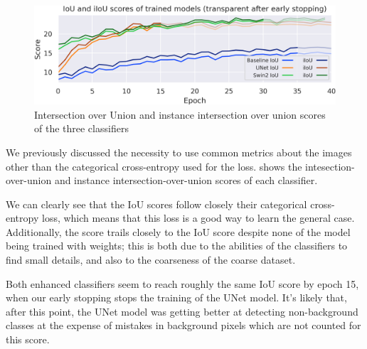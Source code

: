 \begin{figure}[h]
	\centering
	\includegraphics[width=.9\textwidth]{iou_scores.png}
	\caption{Intersection over Union and instance intersection over union scores of the three classifiers}
	\label{comparisons}
\end{figure}

We previously discussed the necessity to use common metrics about the images other than the categorical cross-entropy used for the loss.
 shows the intesection-over-union and instance intersection-over-union scores of each classifier.


We can clearly see that the IoU scores follow closely their categorical cross-entropy loss, which means that this loss is a good way to learn the general case.
Additionally, the \iiouc{} score trails closely to the IoU score despite none of the model being trained with weights; this is both due to the abilities of the classifiers to find small details, and also to the coarseness of the coarse dataset.

Both enhanced classifiers seem to reach roughly the same IoU score by epoch 15, when our early stopping stops the training of the UNet model.
It's likely that, after this point, the UNet model was getting better at detecting non-background classes at the expense of mistakes in background pixels which are not counted for this score.

